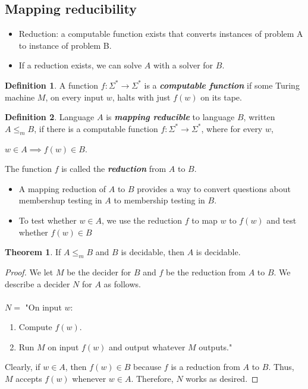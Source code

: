 \documentclass[11pt]{article}
\theoremstyle{definition}
\newtheorem{defn}{Definition}[section]
\newtheorem{thm}{Theorem}[section]
\begin{document}
\subsection{Mapping reducibility}
\begin{itemize}[leftmargin=*]
    \item Reduction: a computable function exists that converts instances of problem A to instance of problem B.
    \item If a reduction exists, we can solve $A$ with a solver for $B$.
\end{itemize}
\begin{defn}
A function $f:\Sigma^*\to\Sigma^*$ is a \textbf{\textit{computable function}} if some Turing machine $M$, on every input $w$, halts with just $f(w)$ on its tape.
\end{defn}
\begin{defn}
Language $A$ is \textbf{\textit{mapping reducible}} to language $B$, written $A\leq_m B$, if there is a computable function $f:\Sigma^*\to\Sigma^*$, where for every $w$,
    \begin{center}
        $w\in A\implies f(w) \in B$.
    \end{center}
The function $f$ is called the \textbf{\textit{reduction}} from $A$ to $B$.
\end{defn}
\begin{itemize}[leftmargin=*]
    \item A mapping reduction of $A$ to $B$ provides a way to convert questions about membershup testing in $A$ to membership testing in $B$. 
    \item To test whether $w \in A$, we use the reduction $f$ to map $w$ to $f(w)$ and test whether $f(w)\in B$
\end{itemize}
\begin{thm}
    If $A\leq_m B$ and $B$ is decidable, then $A$ is decidable. 
\end{thm}
\begin{proof}
    We let $M$ be the decider for $B$ and $f$ be the reduction from $A$ to $B$. We describe a decider $N$ for $A$ as follows.\\\\
    $N =$ "On input $w$:
    \begin{enumerate}
        \item Compute $f(w)$.
        \item Run $M$ on input $f(w)$ and output whatever $M$ outputs."
    \end{enumerate}
    Clearly, if $w \in A$, then $f(w) \in B$ because $f$ is a reduction from $A$ to $B$. Thus, $M$ accepts $f(w)$ whenever $w \in A$. Therefore, $N$ works as desired.
\end{proof}
\end{document}
